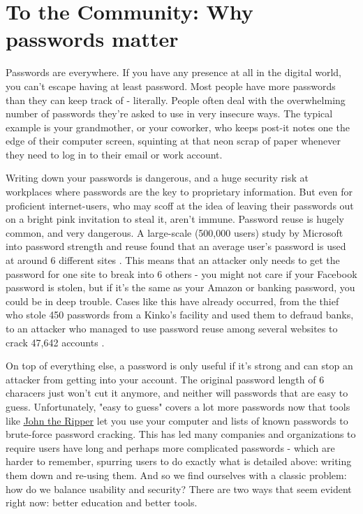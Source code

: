 \documentclass[12pt]{apa6}
\begin{document}
\section{To the Community: Why passwords matter}
Passwords are everywhere. If you have any presence at all in the digital world, you can't escape having at least password. Most people have more passwords than they can keep track of - literally. People often deal with the overwhelming number of passwords they're asked to use in very insecure ways. The typical example is your grandmother, or your coworker, who keeps post-it notes one the edge of their computer screen, squinting at that neon scrap of paper whenever they need to log in to their email or work account. 

Writing down your passwords is dangerous, and a huge security risk at workplaces where passwords are the key to proprietary information. But even for proficient internet-users, who may scoff at the idea of leaving their passwords out on a bright pink invitation to steal it, aren't immune. Password reuse is hugely common, and very dangerous. A large-scale (500,000 users) study by Microsoft into password strength and reuse found that an average user's password is used at around 6 different sites \parencite{floren07}. This means that an attacker only needs to get the password for one site to break into 6 others - you might not care if your Facebook password is stolen, but if it's the same as your Amazon or banking password, you could be in deep trouble. Cases like this have already occurred, from the thief who stole 450 passwords from a Kinko's facility and used them to defraud banks, to an attacker who managed to use password reuse among several websites to crack 47,642 accounts \parencite{ives04}.

On top of everything else, a password is only useful if it's strong and can stop an attacker from getting into your account. The original password length of 6 characers just won't cut it anymore, and neither will passwords that are easy to guess. Unfortunately, "easy to guess" covers a lot more passwords now that tools like \href{http://www.openwall.com/john/}{\color{blue}\underline{John the Ripper}} let you use your computer and lists of known passwords to brute-force password cracking. This has led many companies and organizations to require users have long and perhaps more complicated passwords - which are harder to remember, spurring users to do exactly what is detailed above: writing them down and re-using them. And so we find ourselves with a classic problem: how do we balance usability and security? There are two ways that seem evident right now: better education and better tools.
\end{document}
